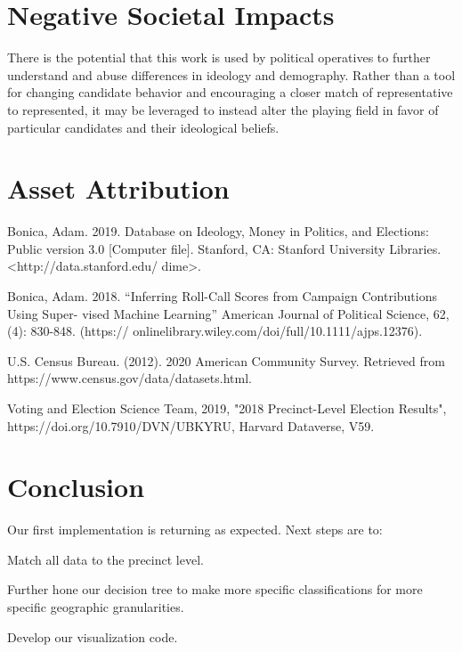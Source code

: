\section{Negative Societal Impacts}

There is the potential that this work is used by political operatives to
further understand and abuse differences in ideology and demography. Rather
than a tool for changing candidate behavior and encouraging a closer match of
representative to represented, it may be leveraged to instead alter the playing
field in favor of particular candidates and their ideological beliefs.

\section{Asset Attribution}


Bonica, Adam. 2019. Database on Ideology, Money in Politics, and Elections: Public version
3.0 [Computer file]. Stanford, CA: Stanford University Libraries. <http://data.stanford.edu/
dime>.


Bonica, Adam. 2018. “Inferring Roll-Call Scores from Campaign Contributions Using Super-
vised Machine Learning” American Journal of Political Science, 62, (4): 830-848. (https://
onlinelibrary.wiley.com/doi/full/10.1111/ajps.12376).

U.S. Census Bureau. (2012). 2020 American Community Survey.  
Retrieved from https://www.census.gov/data/datasets.html.

Voting and Election Science Team, 2019, "2018 Precinct-Level Election Results", 
https://doi.org/10.7910/DVN/UBKYRU, Harvard Dataverse, V59.


\section{Conclusion}

Our first implementation is returning as expected. Next steps are to:
\item Match all data to the precinct level.

\item Further hone our decision tree to make more specific classifications
for more specific geographic granularities.

\item Develop our visualization code.



